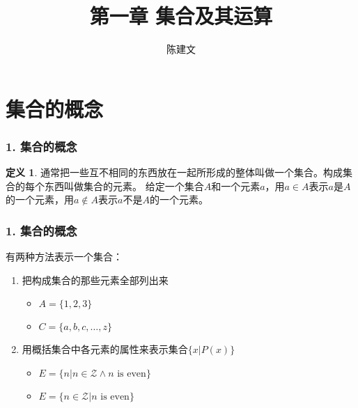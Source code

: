 \documentclass{beamer}
\begin{document}
\begin{CJK*}{UTF8}{gbsn}

\newtheorem{Thm}{定理}[section]
\theoremstyle{definition}
\newtheorem{Def}{定义}[section]
\theoremstyle{example}
\newtheorem*{Ex}{例：}
\newtheorem{Exercise}{习题}

\date{}
\author{陈建文}

\title{第一章 集合及其运算}
\begin{frame}
  \titlepage
\end{frame}  
\section{集合的概念}
\begin{frame}
  \frametitle{1. 集合的概念}
  \begin{Def}
    通常把一些互不相同的东西放在一起所形成的整体叫做一个\alert{集合}。构成集合的每个东西叫做集合的\alert{元素}。
给定一个集合$A$和一个元素$a$，用\alert{$a \in A$}表示$a$是$A$的一个元素，用\alert{$a \notin A$}表示$a$不是$A$的一个元素。
  \end{Def}
\end{frame}

\begin{frame}
  \frametitle{1. 集合的概念}

有两种方法表示一个集合：
\begin{enumerate}
\item 把构成集合的那些元素全部列出来
  \begin{itemize}
\pause
  \item $A = \{1, 2, 3\}$
\pause
\item $C = \{a, b, c, \ldots, z\}$
  \end{itemize}
\pause
\item 用概括集合中各元素的属性来表示集合$\{x|P(x)\}$
\begin{itemize}
\pause
\item $E = \{n|n \in \mathcal{Z} \land n\text{ is even}\}$
\pause
\item $E = \{n \in \mathcal{Z} | n\text{ is even}\}$
\end{itemize}
\end{enumerate}


\end{frame}


\end{CJK*}
\end{document}
